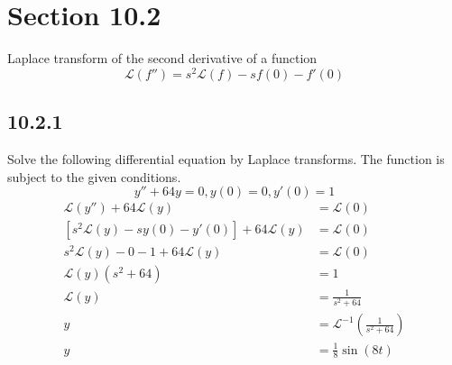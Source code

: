 \documentclass{article}
\begin{document}
\newcommand{\hr}{\par\noindent\rule{\textwidth}{0.4pt}}

\newcommand{\bc}[1]{
	\begin{equation*}
		\begin{boxed}
			{#1}
		\end{boxed}
	\end{equation*}
}

\newcommand{\cond}[2]{
	\ifmmode
		{#1} \quad {#2}
	\else
		$$ {#1} \quad {#2} $$
	\fi
}

\newcommand{\matr}[1]{
	\ifmmode \bm{#1}
	\else \textit{\textbf{#1}}
	\fi
}
\newcommand{\vect}[1]{
	\ifmmode \mathbf{#1}
	\else \textbf{#1}
	\fi
}

\newcommand{\lap}{\mathcal{L}}
\newcommand{\ilap}{\mathcal{L}^{-1}}

\tableofcontents

\section{Section 10.2}

Laplace transform of the second derivative of a function
\begin{equation}
	\lap(f'') = s^2\lap(f) - sf(0) - f'(0)
\end{equation}

\subsection{10.2.1}

Solve the following differential equation by Laplace transforms. The function is subject to the given conditions.
\begin{equation*}
	y'' + 64y = 0, y(0) = 0, y'(0) = 1
\end{equation*}
\begin{align*}
	\lap(y'') + 64\lap(y) & = \lap(0) \\
	\left[ s^2\lap(y) - sy(0) - y'(0) \right] + 64\lap(y) & = \lap(0) \\
	s^2\lap(y) - 0 - 1 + 64\lap(y) & = \lap(0) \\
	\lap(y)(s^2 + 64) & = 1 \\
	\lap(y) & = \frac{1}{s^2 + 64} \\
	y & = \ilap \left( \frac{1}{s^2 + 64} \right) \\
	y & = \frac{1}{8}\sin(8t)
\end{align*}
\end{document}
